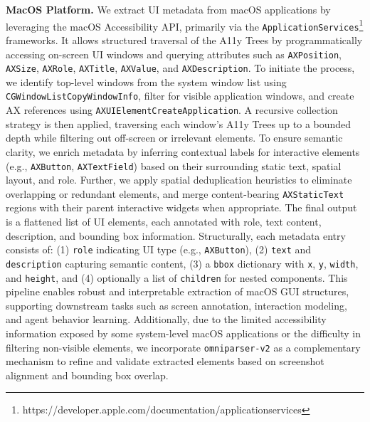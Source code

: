 \textbf{MacOS Platform.} We extract UI metadata from macOS applications by leveraging the macOS Accessibility API, primarily via the \texttt{ApplicationServices}\footnote{https://developer.apple.com/documentation/applicationservices} frameworks. It allows structured traversal of the A11y Trees by programmatically accessing on-screen UI windows and querying attributes such as \texttt{AXPosition}, \texttt{AXSize}, \texttt{AXRole}, \texttt{AXTitle}, \texttt{AXValue}, and \texttt{AXDescription}. To initiate the process, we identify top-level windows from the system window list using \texttt{CGWindowListCopyWindowInfo}, filter for visible application windows, and create AX references using \texttt{AXUIElementCreateApplication}. A recursive collection strategy is then applied, traversing each window's A11y Trees up to a bounded depth while filtering out off-screen or irrelevant elements. To ensure semantic clarity, we enrich metadata by inferring contextual labels for interactive elements (e.g., \texttt{AXButton}, \texttt{AXTextField}) based on their surrounding static text, spatial layout, and role. Further, we apply spatial deduplication heuristics to eliminate overlapping or redundant elements, and merge content-bearing \texttt{AXStaticText} regions with their parent interactive widgets when appropriate. The final output is a flattened list of UI elements, each annotated with role, text content, description, and bounding box information. Structurally, each metadata entry consists of: (1) \texttt{role} indicating UI type (e.g., \texttt{AXButton}), (2) \texttt{text} and \texttt{description} capturing semantic content, (3) a \texttt{bbox} dictionary with \texttt{x}, \texttt{y}, \texttt{width}, and \texttt{height}, and (4) optionally a list of \texttt{children} for nested components. This pipeline enables robust and interpretable extraction of macOS GUI structures, supporting downstream tasks such as screen annotation, interaction modeling, and agent behavior learning. Additionally, due to the limited accessibility information exposed by some system-level macOS applications or the difficulty in filtering non-visible elements, we incorporate \texttt{omniparser-v2} as a complementary mechanism to refine and validate extracted elements based on screenshot alignment and bounding box overlap.

